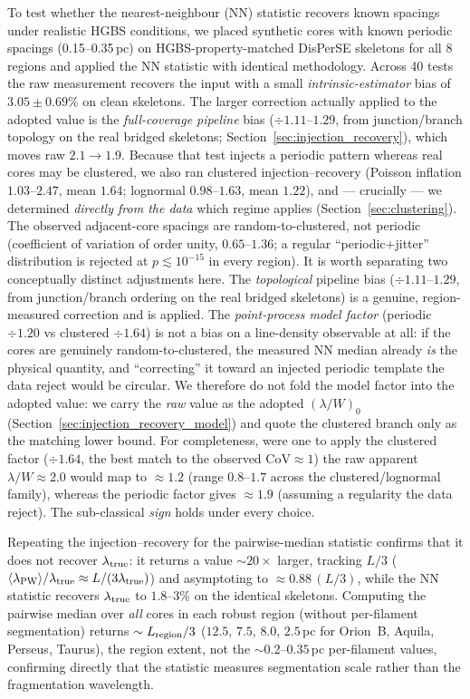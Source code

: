 \documentclass[usenatbib,twoside,twocolumn]{mnras}
\begin{document}
To test whether the nearest-neighbour (NN) statistic recovers known spacings under realistic HGBS conditions, we placed synthetic cores with known periodic spacings (0.15--0.35\,pc) on HGBS-property-matched DisPerSE skeletons for all 8 regions and applied the NN statistic with identical methodology. Across 40 tests the raw measurement recovers the input with a small \emph{intrinsic-estimator} bias of $3.05 \pm 0.69$\% on clean skeletons. The larger correction actually applied to the adopted value is the \emph{full-coverage pipeline} bias ($\div1.11$--$1.29$, from junction/branch topology on the real bridged skeletons; Section~\ref{sec:injection_recovery}), which moves raw $2.1\to1.9$. Because that test injects a periodic pattern whereas real cores may be clustered, we also ran clustered injection--recovery (Poisson inflation $1.03$--$2.47$, mean $1.64$; lognormal $0.98$--$1.63$, mean $1.22$), and --- crucially --- we determined \emph{directly from the data} which regime applies (Section~\ref{sec:clustering}). The observed adjacent-core spacings are random-to-clustered, not periodic (coefficient of variation of order unity, $0.65$--$1.36$; a regular ``periodic$+$jitter'' distribution is rejected at $p\lesssim10^{-15}$ in every region). It is worth separating two conceptually distinct adjustments here. The \emph{topological} pipeline bias ($\div1.11$--$1.29$, from junction/branch ordering on the real bridged skeletons) is a genuine, region-measured correction and is applied. The \emph{point-process model factor} (periodic $\div1.20$ vs clustered $\div1.64$) is not a bias on a line-density observable at all: if the cores are genuinely random-to-clustered, the measured NN median already \emph{is} the physical quantity, and ``correcting'' it toward an injected periodic template the data reject would be circular. We therefore do not fold the model factor into the adopted value: we carry the \emph{raw} value as the adopted $(\lambda/W)_0$ (Section~\ref{sec:injection_recovery_model}) and quote the clustered branch only as the matching lower bound. For completeness, were one to apply the clustered factor ($\div1.64$, the best match to the observed CoV$\approx1$) the raw apparent $\lambda/W\approx2.0$ would map to $\approx1.2$ (range $0.8$--$1.7$ across the clustered/lognormal family), whereas the periodic factor gives $\approx1.9$ (assuming a regularity the data reject). The sub-classical \emph{sign} holds under every choice.

Repeating the injection--recovery for the pairwise-median statistic confirms that it does not recover $\lambda_{\rm true}$: it returns a value $\sim$$20\times$ larger, tracking $L/3$ ($\langle\lambda_{\rm PW}\rangle/\lambda_{\rm true}\approx L/(3\lambda_{\rm true})$) and asymptoting to $\approx0.88\,(L/3)$, while the NN statistic recovers $\lambda_{\rm true}$ to $1.8$--$3\%$ on the identical skeletons. Computing the pairwise median over \emph{all} cores in each robust region (without per-filament segmentation) returns $\sim L_{\rm region}/3$ ($12.5$, $7.5$, $8.0$, $2.5$\,pc for Orion~B, Aquila, Perseus, Taurus), the region extent, not the $\sim0.2$--$0.35$\,pc per-filament values, confirming directly that the statistic measures segmentation scale rather than the fragmentation wavelength.
\end{document}
